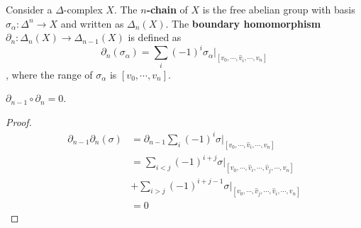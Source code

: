 \begin{defn} Consider a $\Delta$-complex $X$. The \textbf{$n$-chain} of $X$ is the free abelian group with basis $\sigma_\alpha:\Delta^n\rightarrow X$ and written as $\Delta_n(X)$. The \textbf{boundary homomorphism} $\partial_n:\Delta_n(X)\rightarrow \Delta_{n-1}(X)$ is defined as
\begin{equation}
\partial_n (\sigma_\alpha)=\sum_i (-1)^i\sigma_\alpha |_{[v_0,\cdots,\hat{v}_i,\cdots,v_n]}
\end{equation}, where the range of $\sigma_\alpha$ is $[v_0,\cdots,v_n]$.
\end{defn}
\begin{prop}$\partial_{n-1}\circ \partial_{n}=0$.
\end{prop}
\begin{proof}
\begin{align*}
\partial_{n-1}\partial_n(\sigma)&=\partial_{n-1}\sum_i (-1)^i\sigma|_{[v_0,\cdots,\hat{v}_i,\cdots,v_n]}\\
&=\sum_{i<j} (-1)^{i+j}\sigma|_{[v_0,\cdots,\hat{v}_i,\cdots,\hat{v}_j,\cdots,v_n]}\\
&+\sum_{i>j} (-1)^{i+j-1}\sigma|_{[v_0,\cdots,\hat{v}_j,\cdots,\hat{v}_i,\cdots,v_n]}\\
&=0
\end{align*}
\end{proof}

